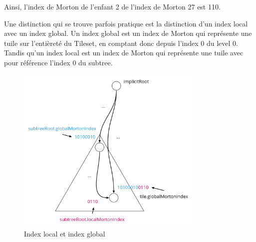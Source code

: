 Ainsi, l'index de Morton de l'enfant 2 de l'index de Morton 27 est 110.

\newpage
Une distinction qui se trouve parfois pratique est la distinction d'un index local avec un index global. Un index global est un index de Morton qui représente une tuile sur l'entièreté du Tileset, en comptant donc depuis l'index 0 du level 0. Tandis qu'un index local est un index de Morton qui représente une tuile avec pour référence l'index 0 du subtree.

\begin{figure}[H]
    \centering
    \includegraphics[width=0.8\textwidth]{assets/figures/global-to-local-morton.png}
    \caption{Index local et index global \cite{availability-gh}}
    \label{fig:morton-global-local}
\end{figure}